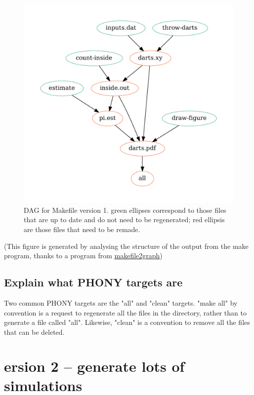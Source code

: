 \documentclass[12pt]{article}\usepackage[]{graphicx}\usepackage[]{color}
\begin{document}
\begin{figure}
  \centering
	\includegraphics{v1-R/graph.pdf}
  \caption{DAG for Makefile version 1.  green ellipses correspond to
    those files that are up to date and do not need to be regenerated;
  red ellipsis are those files that need to be remade.}
  \label{fig:dag}
\end{figure}


(This figure is generated by analysing the structure of the output
from the make program, thanks to a program from \url{makefile2graph})

\subsection{Explain what PHONY targets are}

Two common PHONY targets are the "all" and "clean" targets.  "make
all" by convention is a request to regenerate all the files in the
directory, rather than to generate a file called "all".  Likewise,
"clean" is a convention to remove all the files that can be deleted.




\clearpage

\section{ersion 2 -- generate lots of simulations}
\end{document}
